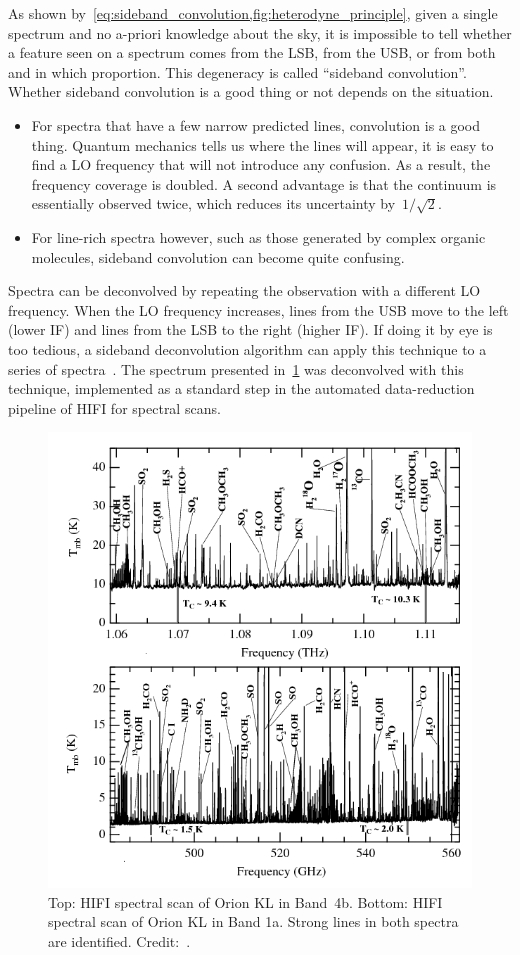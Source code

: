 As shown by~\cref{eq:sideband_convolution,fig:heterodyne_principle}, given a single spectrum and no a-priori knowledge about the sky, it is impossible to tell whether a feature seen on a spectrum comes from the LSB, from the USB, or from both and in which proportion.
This degeneracy is called ``sideband convolution''.
Whether sideband convolution is a good thing or not depends on the situation.
\begin{itemize}[noitemsep,nolistsep]
    \item For spectra that have a few narrow predicted lines, convolution is a good thing.
    Quantum mechanics tells us where the lines will appear, it is easy to find a LO frequency that will not introduce any confusion.
    As a result, the frequency coverage is doubled.
    A second advantage is that the continuum is essentially observed twice, which reduces its uncertainty by~$1/\sqrt{2}$.
    \item For line-rich spectra however, such as those generated by complex organic molecules, sideband convolution can become quite confusing.
\end{itemize}

Spectra can be deconvolved by repeating the observation with a different LO frequency.
When the LO frequency increases, lines from the USB move to the left (lower IF) and lines from the LSB to the right (higher IF).
If doing it by eye is too tedious, a sideband deconvolution algorithm can apply this technique to a series of spectra~\autocite{comito2002deconvolution}.
The spectrum presented in~\cref{fig:hexos} was deconvolved with this technique, implemented as a standard step in the automated data-reduction pipeline of HIFI for spectral scans.

\begin{figure}[t]
    \centering
    \includegraphics[width=.8\textwidth]{hifi_hexos}
    \caption{Top: HIFI spectral scan of Orion KL in Band~4b. Bottom: HIFI spectral scan of Orion KL in Band 1a. Strong lines in both spectra are identified.  Credit:~\autocite{bergin2010herschel}.
    }
    \label{fig:hexos}
\end{figure}



